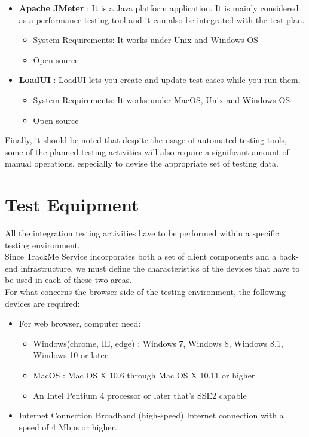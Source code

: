 \documentclass[a4paper, hidelinks, 12pt]{report}
\begin{document}
	\begin{itemize}
	\item{\textbf{Apache JMeter}} : It is a Java platform application. It is mainly considered as a performance testing tool and it can also be integrated with the test plan.
	\begin{itemize}
	\item{} System Requirements: It works under Unix and Windows OS
	\item{} Open source
	\end{itemize}
	\item{\textbf{LoadUI}} : LoadUI lets you create and update test cases while you run them.
	\begin{itemize}
	\item{} System Requirements: It works under MacOS, Unix and Windows OS
	\item{} Open source
	\end{itemize}
	\end{itemize} 
	Finally, it should be noted that despite the usage of automated testing tools, some of the planned testing activities will also require a significant amount of manual operations, especially to devise the appropriate set of testing data.
	
	\section{Test Equipment}
	All the integration testing activities have to be performed within a specific testing environment.\\
	
	Since TrackMe Service incorporates both a set of client components and a back-end infrastructure, we must define the characteristics of the devices that have to be used in each of these two areas.\\
	
	For what concerns the browser side of the testing environment, the following devices are required:
\begin{itemize}
	\item{} For web browser, computer need:
	\begin{itemize}
	\item{Windows(chrome, IE, edge)} : Windows 7, Windows 8, Windows 8.1, Windows 10 or later
	\item{MacOS} :  Mac OS X 10.6 through Mac OS X 10.11 or higher
	\item{} An Intel Pentium 4 processor or later that's SSE2 capable
	\end{itemize}
	\item{} Internet Connection Broadband (high-speed) Internet connection with a speed of 4 Mbps or 		higher.
\end{itemize}
	
\end{document}
